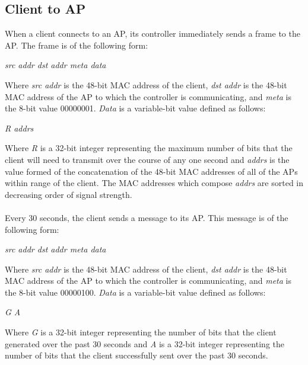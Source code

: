 \documentclass[10pt,journal,compsoc]{IEEEtran}
\begin{document}
		\subsection{Client to AP}
		When a client connects to an AP, its controller immediately sends a frame to the AP. The frame is of the following form:
		\begin{center}\textit{ src addr \textbar dst addr \textbar meta \textbar data  }\end{center}
		Where \textit{src addr} is the 48-bit MAC address of the client, \textit{dst addr} is the 48-bit MAC address of the AP to which the controller is communicating, and \textit{meta} is the 8-bit value 00000001. \textit{Data} is a variable-bit value defined as follows:
		\begin{center}\textit{R \textbar addrs}\end{center}
		Where \textit{R} is a 32-bit integer representing the maximum number of bits that the client will need to transmit over the course of any one second and \textit{addrs} is the value formed of the concatenation of the 48-bit MAC addresses of all of the APs within range of the client. The MAC addresses which compose \textit{addrs} are sorted in decreasing order of signal strength.\\
		\\
		Every 30 seconds, the client sends a message to its AP. This message is of the following form:
		\begin{center}\textit{ src addr \textbar dst addr \textbar meta \textbar data  }\end{center}
		Where \textit{src addr} is the 48-bit MAC address of the client, \textit{dst addr} is the 48-bit MAC address of the AP to which the controller is communicating, and \textit{meta} is the 8-bit value 00000100. \textit{Data} is a variable-bit value defined as follows:
		\begin{center}\textit{G \textbar A}\end{center}
		Where \textit{G} is a 32-bit integer representing the number of bits that the client generated over the past 30 seconds and \textit{A} is a 32-bit integer representing the number of bits that the client successfully sent over the past 30 seconds.
		
\end{document}
